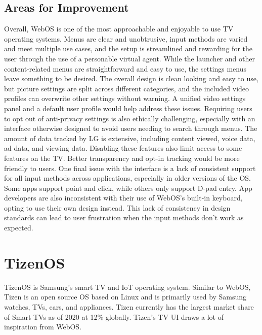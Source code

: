 \documentclass[12pt, letterpaper]{article}
\begin{document}
\subsection{Areas for Improvement}
Overall, WebOS is one of the most approachable and enjoyable to use TV operating systems.  Menus are clear and unobtrusive, input methods are varied and meet multiple use cases, and the setup is streamlined and rewarding for the user through the use of a personable virtual agent. While the launcher and other content-related menus are straightforward and easy to use, the settings menus leave something to be desired.  The overall design is clean looking and easy to use, but picture settings are split across
different categories, and the included video profiles can overwrite other settings without warning.  A unified video settings panel and a default user profile would help address these issues. Requiring users to opt out of anti-privacy settings is also ethically challenging, especially with an interface otherwise designed to avoid users needing to search through menus.  The amount of data tracked by LG is extensive, including content viewed, voice data, ad data, and viewing data.  Disabling these features also
limit access to some features on the TV.  Better transparency and opt-in tracking would be more friendly to users. One final issue with the interface is a lack of consistent support for all input methods across applications, especially in older versions of the OS.  Some apps support point and click, while others only support D-pad entry. App developers are also inconsistent with their use of WebOS's built-in keyboard, opting to use their own design instead.  This lack of consistency in design standards can lead to 
user frustration when the input methods don't work as expected.  
\section{TizenOS}
TizenOS is Samsung's smart TV and IoT operating system. Similar to WebOS, Tizen is an open source OS based on Linux and is primarily used by Samsung watches, TVs, cars, and appliances. Tizen currently has the largest market share of Smart TVs as of 2020 at 12\% globally\cite{strategy_analytics_2020}.  Tizen's TV UI draws a lot of inspiration from WebOS.
\end{document}
